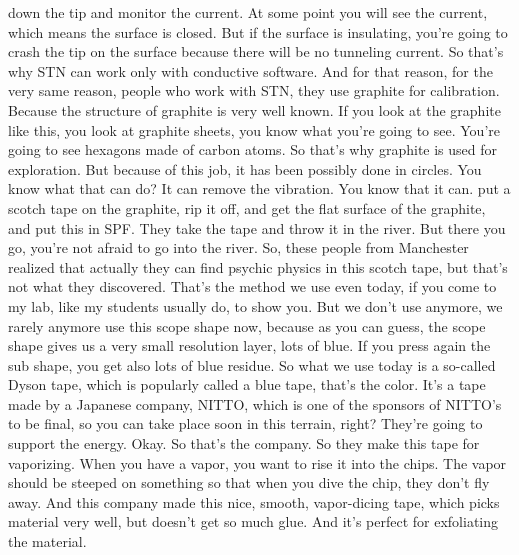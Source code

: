 down the tip and monitor the current. At some point you will see the current, which means the surface is closed. But if the surface is insulating, you're going to crash the tip on the surface because there will be no tunneling current. So that's why STN can work only with conductive software. And for that reason, for the very same reason, people who work with STN, they use graphite for calibration. Because the structure of graphite is very well known. If you look at the graphite like this, you look at graphite sheets, you know what you're going to see. You're going to see hexagons made of carbon atoms. So that's why graphite is used for exploration. But because of this job, it has been possibly done in circles. You know what that can do? It can remove the vibration. You know that it can. put a scotch tape on the graphite, rip it off, and get the flat surface of the graphite, and put this in SPF. They take the tape and throw it in the river. But there you go, you're not afraid to go into the river. So, these people from Manchester realized that actually they can find psychic physics in this scotch tape, but that's not what they discovered. That's the method we use even today, if you come to my lab, like my students usually do, to show you. But we don't use anymore, we rarely anymore use this scope shape now, because as you can guess, the scope shape gives us a very small resolution layer, lots of blue. If you press again the sub shape, you get also lots of blue residue. So what we use today is a so-called Dyson tape, which is popularly called a blue tape, that's the color. It's a tape made by a Japanese company, NITTO, which is one of the sponsors of NITTO's to be final, so you can take place soon in this terrain, right? They're going to support the energy. Okay. So that's the company. So they make this tape for vaporizing. When you have a vapor, you want to rise it into the chips. The vapor should be steeped on something so that when you dive the chip, they don't fly away. And this company made this nice, smooth, vapor-dicing tape, which picks material very well, but doesn't get so much glue. And it's perfect for exfoliating the material.
